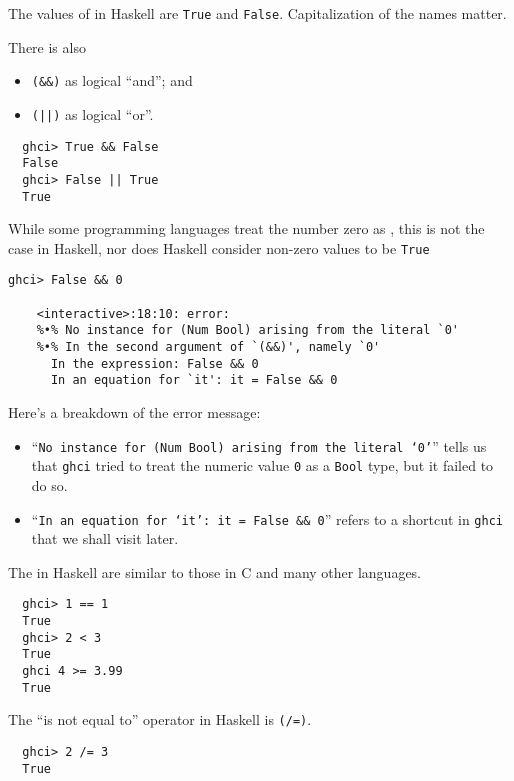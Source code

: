 \documentclass[notoc,notitlepage]{tufte-book}
\begin{document}
The values of  in Haskell are \texttt{True} and \texttt{False}. Capitalization of the names matter.

There is also
\begin{itemize}
  \item \texttt{(\&\&)} as logical ``and''; and
  \item \texttt{(||)} as logical ``or''.
\end{itemize}

\begin{lstlisting}
  ghci> True && False
  False
  ghci> False || True
  True
\end{lstlisting}

\begin{warning}
  While some programming languages treat the number zero as , this is not the case in Haskell, nor does Haskell consider non-zero values to be \texttt{True}
  \begin{lstlisting}[escapechar=\%]
    ghci> False && 0

    <interactive>:18:10: error:
    %•% No instance for (Num Bool) arising from the literal `0'
    %•% In the second argument of `(&&)', namely `0'
      In the expression: False && 0
      In an equation for `it': it = False && 0
  \end{lstlisting}
  Here's a breakdown of the error message:
  \begin{itemize}
    \item ``\textnormal{\texttt{No instance for (Num Bool) arising from the literal `0'}}'' tells us that \texttt{ghci} tried to treat the numeric value \texttt{0} as a \texttt{Bool} type, but it failed to do so.
    \item ``\textnormal{\texttt{In an equation for `it': it = False \&\& 0}}'' refers to a shortcut in \texttt{ghci} that we shall visit later.
  \end{itemize}
\end{warning}

The  in Haskell are similar to those in C and many other languages.

\begin{lstlisting}
  ghci> 1 == 1
  True
  ghci> 2 < 3
  True
  ghci 4 >= 3.99
  True
\end{lstlisting}

The ``is not equal to'' operator in Haskell is \texttt{(/=)}.

\begin{lstlisting}
  ghci> 2 /= 3
  True
\end{lstlisting}
\end{document}
